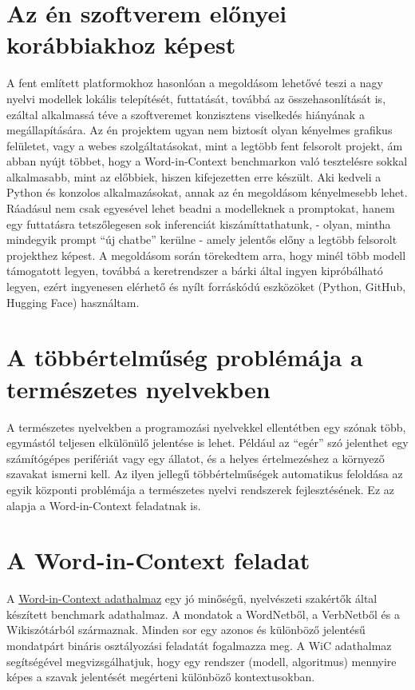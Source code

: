 \documentclass[12pt]{report}
\begin{document}
    \section{Az én szoftverem előnyei korábbiakhoz képest}
    A fent említett platformokhoz hasonlóan a megoldásom lehetővé teszi a nagy nyelvi modellek lokális telepítését, futtatását, továbbá az összehasonlítását is, ezáltal alkalmassá téve a szoftveremet konzisztens viselkedés hiányának a megállapítására.
    Az én projektem ugyan nem biztosít olyan kényelmes grafikus felületet, vagy a webes szolgáltatásokat, mint a legtöbb fent felsorolt projekt, ám abban nyújt többet, hogy a Word-in-Context benchmarkon való tesztelésre sokkal alkalmasabb, mint az előbbiek, hiszen kifejezetten erre készült.
    Aki kedveli a Python és konzolos alkalmazásokat, annak az én megoldásom kényelmesebb lehet.
    Ráadásul nem csak egyesével lehet beadni a modelleknek a promptokat, hanem egy futtatásra tetszőlegesen sok inferenciát kiszámíttathatunk, - olyan, mintha mindegyik prompt ``új chatbe'' kerülne - amely jelentős előny a legtöbb felsorolt projekthez képest.
    A megoldásom során törekedtem arra, hogy minél több modell támogatott legyen, továbbá a keretrendszer a bárki által ingyen kipróbálható legyen, ezért ingyenesen elérhető és nyílt forráskódú eszközöket (Python, GitHub, Hugging Face) használtam.


    \section{A többértelműség problémája a természetes nyelvekben}
    A természetes nyelvekben a programozási nyelvekkel ellentétben egy szónak több, egymástól teljesen elkülönülő jelentése is lehet.
    Például az ``egér'' szó jelenthet egy számítógépes perifériát vagy egy állatot, és a helyes értelmezéshez a környező szavakat ismerni kell.
    Az ilyen jellegű többértelműségek automatikus feloldása az egyik központi problémája a természetes nyelvi rendszerek fejlesztésének.
    Ez az alapja a Word-in-Context feladatnak is.


    \section{A Word-in-Context feladat}
    A \href{https://pilehvar.github.io/wic/}{Word-in-Context adathalmaz} egy jó minőségű, nyelvészeti szakértők által készített benchmark adathalmaz.
    A mondatok a WordNetből, a VerbNetből és a Wikiszótárból származnak.
    Minden sor egy azonos és különböző jelentésű mondatpárt bináris osztályozási feladatát fogalmazza meg.
    A WiC adathalmaz segítségével megvizsgálhatjuk, hogy egy rendszer (modell, algoritmus) mennyire képes a szavak jelentését megérteni különböző kontextusokban.
\end{document}
